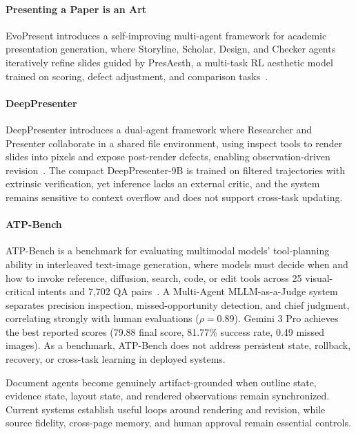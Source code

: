 \paragraph{Presenting a Paper is an Art}
EvoPresent introduces a self-improving multi-agent framework for academic presentation generation, where Storyline, Scholar, Design, and Checker agents iteratively refine slides guided by PresAesth, a multi-task RL aesthetic model trained on scoring, defect adjustment, and comparison tasks~\cite{avg251005571}. 

\paragraph{DeepPresenter}
DeepPresenter introduces a dual-agent framework where Researcher and Presenter collaborate in a shared file environment, using inspect tools to render slides into pixels and expose post-render defects, enabling observation-driven revision~\cite{zheng2026deeppresenter}. The compact DeepPresenter-9B is trained on filtered trajectories with extrinsic verification, yet inference lacks an external critic, and the system remains sensitive to context overflow and does not support cross-task updating.

\paragraph{ATP-Bench}
ATP-Bench is a benchmark for evaluating multimodal models' tool-planning ability in interleaved text-image generation, where models must decide when and how to invoke reference, diffusion, search, code, or edit tools across 25 visual-critical intents and 7,702 QA pairs~\cite{avg260329902}. A Multi-Agent MLLM-as-a-Judge system separates precision inspection, missed-opportunity detection, and chief judgment, correlating strongly with human evaluations ($\rho=0.89$). Gemini 3 Pro achieves the best reported scores (79.88 final score, 81.77\% success rate, 0.49 missed images). As a benchmark, ATP-Bench does not address persistent state, rollback, recovery, or cross-task learning in deployed systems. 


Document agents become genuinely artifact-grounded when outline state, evidence state, layout state, and rendered observations remain synchronized. Current systems establish useful loops around rendering and revision, while source fidelity, cross-page memory, and human approval remain essential controls.

\FloatBarrier
